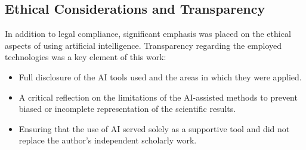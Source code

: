 \subsection*{Ethical Considerations and Transparency}
In addition to legal compliance, significant emphasis was placed on the ethical aspects of using artificial intelligence. Transparency regarding the employed technologies was a key element of this work:
\begin{itemize}
    \item Full disclosure of the AI tools used and the areas in which they were applied.
    \item A critical reflection on the limitations of the AI-assisted methods to prevent biased or incomplete representation of the scientific results.
    \item Ensuring that the use of AI served solely as a supportive tool and did not replace the author’s independent scholarly work.
\end{itemize}
